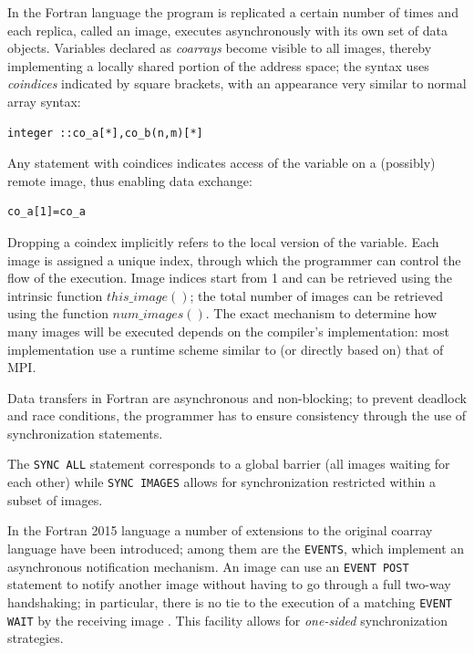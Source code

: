 \documentclass{IOS-Book-Article}
\begin{document}
In the Fortran language the program is replicated a certain number of
times and each replica, called an image, executes asynchronously
with its own set of data objects.  
 Variables  declared as \emph{coarrays} become visible to all images,
 thereby implementing a locally shared portion of the address space;
 the syntax uses \emph{coindices} indicated by square brackets, with
 an appearance very similar to normal array syntax:
{\small
\begin{lstlisting}
integer ::co_a[*],co_b(n,m)[*]
\end{lstlisting}}
Any statement with coindices indicates access of the variable on a
(possibly) remote image, thus enabling data exchange:
{\small
\begin{lstlisting}
co_a[1]=co_a
\end{lstlisting}}
Dropping a coindex implicitly refers to the local version of the
variable. 
Each image is assigned a unique index, through which the programmer
can control the flow of the execution. Image indices start from 1 and
can be retrieved using the intrinsic function $this\_image()$;  the
total number of images can be retrieved using the function
$num\_images()$. %
The exact mechanism to determine how many images will be executed
depends on the compiler's implementation: most implementation use a
runtime scheme similar to (or directly based on) that of MPI. 

Data transfers in Fortran are asynchronous and non-blocking;
to prevent  deadlock and race conditions, the programmer has to ensure
consistency through the use of synchronization statements.

The \verb|SYNC ALL| statement corresponds to a global barrier (all
images waiting for each other) while \verb|SYNC IMAGES| allows for
 synchronization restricted within a subset of images.

In the Fortran 2015 language a number of extensions to the original
coarray language have been introduced; among them are the
\verb|EVENTS|, which implement an asynchronous notification
mechanism. 
An image can use an \verb|EVENT POST| statement to notify another
image without having to go through a full two-way handshaking; in
particular, there is no tie to the 
execution of a matching \verb|EVENT WAIT| by the receiving image .
This facility allows for \emph{one-sided} synchronization
strategies.   
\end{document}
